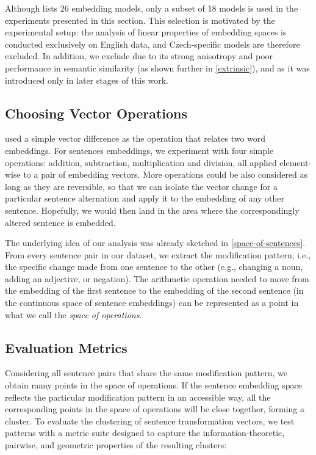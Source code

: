 Although  lists 26 embedding models, only a subset of 18 models is used in the experiments presented in this section. This selection is motivated by the experimental setup: the analysis of linear properties of embedding spaces is conducted exclusively on English data, and Czech-specific models are therefore excluded. In addition, we exclude \xlmr 
due to its strong anisotropy and poor performance in semantic similarity (as shown further in \cref{extrinsic}), and \mepet as it was introduced only in later stages of this work.


\subsection{Choosing Vector Operations}
\label{operations}
\cite{word2vec} used a simple vector difference as the operation that relates two word embeddings. For sentences embeddings, we experiment with four simple operations: addition, subtraction, multiplication and division, all applied element-wise to a pair of embedding vectors. More operations could be also considered as long as they are reversible, so that we can isolate the vector change for a particular sentence alternation and apply it to the embedding of any other sentence. Hopefully, we would then land in the area where the correspondingly altered sentence is embedded.

The underlying idea of our analysis was already sketched in \cref{space-of-sentences}. From every sentence pair in our dataset, we extract the modification pattern, i.e., the specific change made from one sentence to the other (e.g., changing a noun, adding an adjective, or negation). The arithmetic operation needed to move from  the embedding of the first sentence to the embedding of the second sentence (in the continuous space of sentence embeddings) can be represented as a point in what we call the \emph{space of operations}. 


\subsection{Evaluation Metrics}
\label{clustering_metrics}

Considering all sentence pairs that share the same modification pattern, we obtain many points in the space of operations. If the sentence embedding space reflects the particular modification pattern in an accessible way, all the corresponding points in the space of operations will be close together, forming a cluster. To evaluate the clustering of sentence transformation vectors, we test patterns with a metric suite designed to capture the information-theoretic, pairwise, and geometric properties of the resulting clusters:

